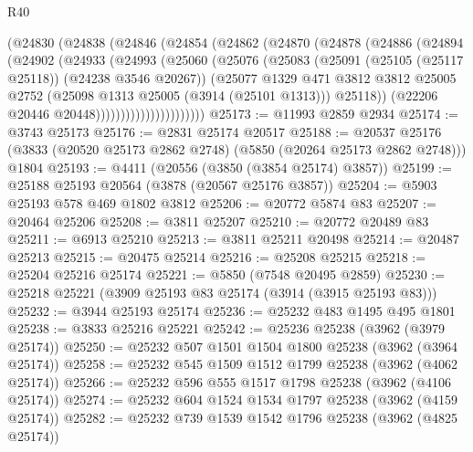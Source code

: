 \begin{lexlean}{R40}
\begin{coremodule}
                  (@24830
                    (@24838
                      (@24846
                        (@24854
                          (@24862
                            (@24870
                              (@24878
                                (@24886
                                  (@24894
                                    (@24902
                                      (@24933
                                        (@24993
                                          (@25060
                                            (@25076
                                              (@25083
                                                (@25091
                                                  (@25105 (@25117 @25118))
                                                  (@24238 @3546 @20267))
                                                (@25077
                                                  @1329
                                                  @471
                                                  @3812
                                                  @3812
                                                  @25005
                                                  @2752
                                                  (@25098 @1313 @25005 (@3914 (@25101 @1313)))
                                                  @25118))
                                              (@22206 @20446 @20448))))))))))))))))))))))
@25173 := @11993 @2859 @2934
@25174 := @3743 @25173
@25176 := @2831 @25174 @20517
@25188 := @20537
    @25176
    (@3833 (@20520 @25173 @2862 @2748) (@5850 (@20264 @25173 @2862 @2748)))
    @1804
@25193 := @4411 (@20556 (@3850 (@3854 @25174) @3857))
@25199 := @25188 @25193 @20564 (@3878 (@20567 @25176 @3857))
@25204 := @5903 @25193 @578 @469 @1802 @3812
@25206 := @20772 @5874 @83
@25207 := @20464 @25206
@25208 := @3811 @25207
@25210 := @20772 @20489 @83
@25211 := @6913 @25210
@25213 := @3811 @25211 @20498
@25214 := @20487 @25213
@25215 := @20475 @25214
@25216 := @25208 @25215
@25218 := @25204 @25216 @25174
@25221 := @5850 (@7548 @20495 @2859)
@25230 := @25218 @25221 (@3909 @25193 @83 @25174 (@3914 (@3915 @25193 @83)))
@25232 := @3944 @25193 @25174
@25236 := @25232 @483 @1495 @495 @1801
@25238 := @3833 @25216 @25221
@25242 := @25236 @25238 (@3962 (@3979 @25174))
@25250 := @25232 @507 @1501 @1504 @1800 @25238 (@3962 (@3964 @25174))
@25258 := @25232 @545 @1509 @1512 @1799 @25238 (@3962 (@4062 @25174))
@25266 := @25232 @596 @555 @1517 @1798 @25238 (@3962 (@4106 @25174))
@25274 := @25232 @604 @1524 @1534 @1797 @25238 (@3962 (@4159 @25174))
@25282 := @25232 @739 @1539 @1542 @1796 @25238 (@3962 (@4825 @25174))

\end{coremodule}
\end{lexlean}
